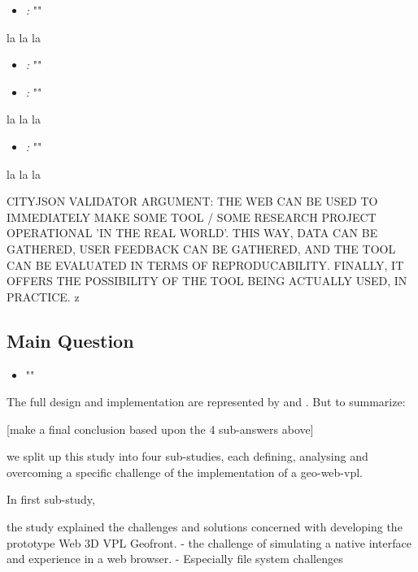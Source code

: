 \begin{itemize}[ ]
  \item \emph{\mySubRQOneTitle:} "\mySubRQOne"
\end{itemize}

la la la

\begin{itemize}[ ]
  \item \emph{\mySubRQTwoTitle:} "\mySubRQTwo"
\end{itemize}


\begin{itemize}[ ]
  \item \emph{\mySubRQThreeTitle:}  "\mySubRQThree"
\end{itemize}

la la la

\begin{itemize}[ ]
  \item \emph{\mySubRQFourTitle:} "\mySubRQFour"
\end{itemize}

la la la


CITYJSON VALIDATOR ARGUMENT: THE WEB CAN BE USED TO IMMEDIATELY MAKE SOME TOOL / SOME RESEARCH PROJECT OPERATIONAL 'IN THE REAL WORLD'. THIS WAY, DATA CAN BE GATHERED, USER FEEDBACK CAN BE GATHERED, AND THE TOOL CAN BE EVALUATED IN TERMS OF REPRODUCABILITY. FINALLY, IT OFFERS THE POSSIBILITY OF THE TOOL BEING ACTUALLY USED, IN PRACTICE. 
z

\subsection*{Main Question}

\begin{itemize}[ ]
    \item "\myMainRQ"
\end{itemize}

The full design and implementation are represented by  and . 
But to summarize:

[make a final conclusion based upon the 4 sub-answers above]

we split up this study into four sub-studies, each defining, analysing and overcoming a specific challenge of the implementation of a \ac{geo-web-vpl}.

In first sub-study, 

the study explained the challenges and solutions concerned with developing the prototype Web 3D VPL Geofront.
- the challenge of simulating a native interface and experience in a web browser. 
- Especially file system challenges 

